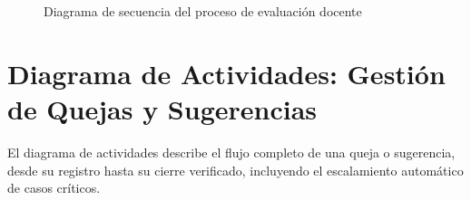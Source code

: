 \begin{figure}[H]
{%
}
\caption{Diagrama de secuencia del proceso de evaluación docente}
\label{fig:secuencia-evaluacion}
\end{figure}

\section{Diagrama de Actividades: Gestión de Quejas y Sugerencias}

El diagrama de actividades describe el flujo completo de una queja o sugerencia,
desde su registro hasta su cierre verificado, incluyendo el escalamiento
automático de casos críticos.

